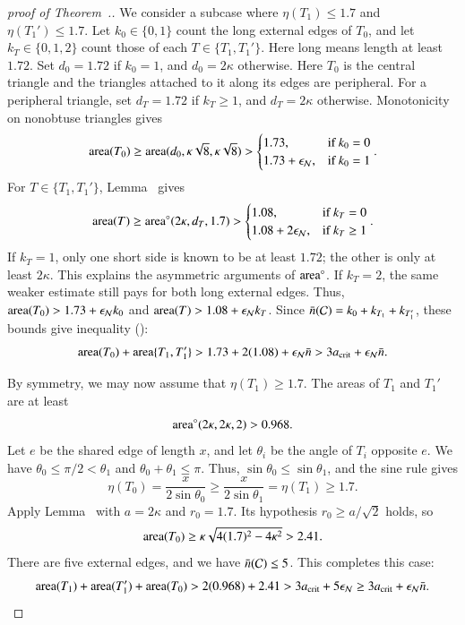 \begin{proof}[proof of Theorem~.]
We consider a subcase where $\eta(T_1)\le1.7$ and
$\eta(T_1')\le1.7$.  Let $k_0\in\{0,1\}$ count the long external
edges of $T_0$, and let $k_T\in\{0,1,2\}$ count those of each
$T\in\{T_1,T_1'\}$.  Here long means length at least $1.72$.
Set $d_0=1.72$ if $k_0=1$, and $d_0=2\kappa$ otherwise.
Here $T_0$ is the central triangle and the triangles attached to it
along its edges are peripheral. For a peripheral triangle, set $d_T=1.72$ if $k_T\ge1$, and
$d_T=2\kappa$ otherwise.  Monotonicity on nonobtuse triangles gives
\[
{\operatorname{area}}(T_0) \ge {\operatorname{area}}(d_0,\kappa\sqrt{8},\kappa\sqrt{8}) >
   \begin{cases}1.73,&\text{if } k_0=0\\
     1.73+\epsilon_{\mathcal N}, & \text{if } k_0=1 \end{cases}.
\]
For $T\in\{T_1,T_1'\}$,
Lemma~ gives
\begin{equation}\libel{eqn:173}
\area(T) \ge \areta(2\kappa,d_T,1.7) >
   \begin{cases}1.08,&\text{if } k_T=0\\
     1.08+2\epsN, & \text{if } k_T\ge1 \end{cases}.
\end{equation}
If $k_T=1$, only one short side is known to be at least $1.72$;
the other is only at least $2\kappa$.  This explains the asymmetric
arguments of ${\operatorname{area}}^\circ$.  If $k_T=2$, the same weaker estimate still
pays for both long external edges.  Thus,
${\operatorname{area}}(T_0)>1.73+\epsilon_{\mathcal N} k_0$ and
${\operatorname{area}}(T)>1.08+\epsilon_{\mathcal N} k_T$.  Since
$\bar n(\mathcal C)=k_0+k_{T_1}+k_{T_1'}$, these bounds give
inequality ():
\[
{\operatorname{area}}(T_0) +{\operatorname{area}}\{T_1,T_1'\}  > 1.73 + 2(1.08) + \epsilon_{\mathcal N} \bar n > 
3 a_\text{crit} +  \epsilon_{\mathcal N} \bar n.
\]

By symmetry, we may now assume that $\eta(T_1) \ge 1.7$.  
The areas of $T_1$ and $T_1'$ are at least
\begin{equation}\libel{eqn:968}
\areta(2\kappa,2\kappa,2) > 0.968.
\end{equation}
Let $e$ be the shared edge of length $x$, and let $\theta_i$ be the angle of
$T_i$ opposite $e$.  We have $\theta_0\le\pi/2<\theta_1$ and
$\theta_0+\theta_1\le\pi$.  Thus,
$\sin\theta_0\le\sin\theta_1$, and the sine rule gives
\[
\eta(T_0)=\frac{x}{2\sin\theta_0}
\ge\frac{x}{2\sin\theta_1}=\eta(T_1)\ge1.7.
\]
Apply Lemma~ with $a=2\kappa$
and $r_0=1.7$.  Its hypothesis $r_0\ge a/\sqrt2$ holds, so
\[
{\operatorname{area}}(T_0)\ge\kappa\sqrt{4(1.7)^2-4\kappa^2}>2.41.
\]
There are five external edges, and we have $\bar n(\mathcal C)\le 5$.
This completes this case:
\[
{\operatorname{area}}(T_1) + {\operatorname{area}}(T_1') + {\operatorname{area}}(T_0) 
>
2(0.968) + 2.41 > 3a_\text{crit} + 5 \epsilon_{\mathcal N} \ge 3a_\text{crit} + \epsilon_{\mathcal N} \bar n.
\] 


\end{proof}
